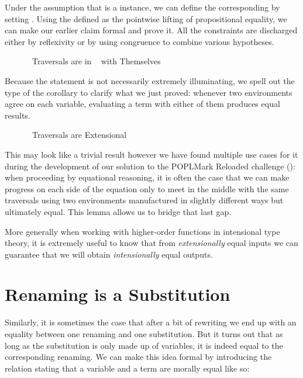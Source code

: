 Under the assumption that  is a  instance, we can define the
corresponding   by setting
.
Using  the  defined as the pointwise lifting of propositional equality,
we can make our earlier claim formal and prove it. All the constraints are discharged
either by reflexivity or by using congruence to combine various hypotheses.

\begin{figure}[h]
\caption{~Traversals are in ~ with Themselves\label{fig:synselfsim}}
\end{figure}

Because the  statement is not necessarily extremely illuminating, we spell
out the type of the corollary to clarify what we just proved: whenever two environments
agree on each variable, evaluating a term with either of them produces equal results.

\begin{figure}[h]
\caption{~Traversals are Extensional\label{fig:synextensional}}
\end{figure}

This may look like a trivial result however we have found multiple use cases
for it during the development of our solution to the POPLMark Reloaded
challenge (\citeyear{poplmark2}): when proceeding by equational reasoning,
it is often the case that we can make progress on each side of the equation
only to meet in the middle with the same traversals using two environments
manufactured in slightly different ways but ultimately equal.
This lemma allows us to bridge that last gap.

More generally when working with higher-order functions in intensional
type theory, it is extremely useful to know that from \emph{extensionally}
equal inputs we can guarantee that we will obtain \emph{intensionally}
equal outputs.

\section{Renaming is a Substitution}

Similarly, it is sometimes the case that after a bit of rewriting we end
up with an equality between one renaming and one substitution. But it turns
out that as long as the substitution is only made up of variables, it is
indeed equal to the corresponding renaming. We can make this idea formal
by introducing the  relation stating that a variable and a
term are morally equal like so:

